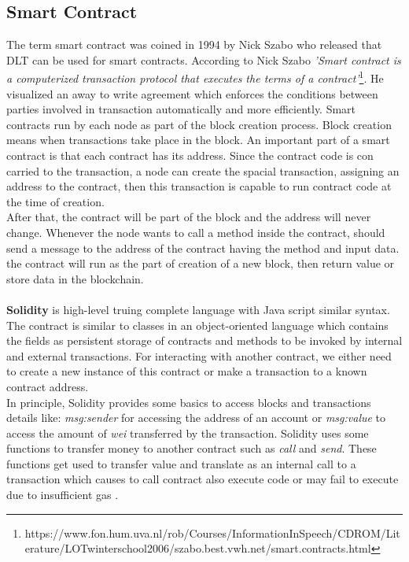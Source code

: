 \subsection{Smart Contract}
 The term smart contract was coined in 1994 by Nick Szabo \cite{Szabo} who released that DLT can be used for smart contracts. 
According to Nick Szabo \textit{'Smart contract is a computerized transaction protocol that executes the terms of a contract'}\footnote{https://www.fon.hum.uva.nl/rob/Courses/InformationInSpeech/CDROM/Literature/LOTwinterschool2006/szabo.best.vwh.net/smart.contracts.html}. He visualized an away to write agreement which enforces the conditions between parties involved in transaction automatically and more efficiently.
Smart contracts run by each node as part of the block creation process. Block creation means when transactions take place in the block.
An important part of a smart contract is that each contract has its address. Since the contract code is con carried to the transaction, a node can create the spacial transaction, assigning an address to the contract, then this transaction is capable to run contract code at the time of creation.\\
After that, the contract will be part of the block and the address will never change. Whenever the node wants to call a method inside the contract, should send a message to the address of the contract having the method and input data.
the contract will run as the part of creation of a new block, then return value or store data in the blockchain\cite{Payrott}.\\
\\
\textbf{Solidity} is high-level truing complete language with Java script similar syntax. The contract is similar to classes in an object-oriented language which contains the fields as persistent storage of contracts and methods to be invoked by internal and external transactions. For interacting with another contract, we either need to create a new instance of this contract or make a transaction to a known contract address.\\
In principle, Solidity provides some basics to access blocks and transactions details like: \textit{msg:sender} for accessing the address of an account or \textit{msg:value} to access the amount of \textit{wei} transferred by the transaction. Solidity uses some functions to transfer money to another contract such as \textit{call} and \textit{send}. These functions get used to transfer value and translate as an internal call to a transaction which causes to call contract also execute code or may fail to execute due to insufficient gas \cite{Ilya}.